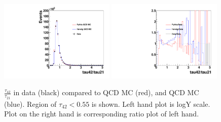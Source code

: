 \begin{figure}[htb]
\begin{center}
\includegraphics[width=0.49\textwidth,angle=0]{figs/SFExtra/SFSameJetRatioPlot55H.pdf}
\includegraphics[width=0.49\textwidth,angle=0]{figs/SFExtra/SFRatioRatioPlot55H.pdf}
\end{center}
\caption{
$\frac{\tau_{42}}{\tau_{21}}$ in data (black) compared to \PYTHIA QCD MC (red), and 
\HERWIG QCD MC (blue). Region of $\tau_{42} < 0.55$ is shown. 
Left hand plot is logY scale. Plot on the right hand is corresponding 
ratio plot of left hand.  
}
\label{fig:tau4221samejetH}
\end{figure}

